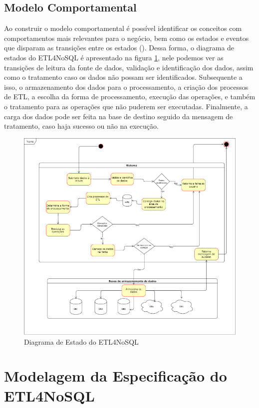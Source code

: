 \subsection{Modelo Comportamental}

Ao construir o modelo comportamental é possível identificar os conceitos com comportamentos mais relevantes para o negócio, bem como os estados e eventos que disparam as transições entre os estados (\cite{itana:2005}). Dessa forma, o diagrama de estados do ETL4NoSQL é apresentado na figura \ref{diagrama_estado}, nele podemos ver as transições de leitura da fonte de dados, validação e identificação dos dados, assim como o tratamento caso os dados não possam ser identificados. Subsequente a isso, o armazenamento dos dados para o processamento, a criação dos processos de ETL, a escolha da forma de processamento, execução das operações, e também o tratamento para as operações que não puderem ser executadas. Finalmente, a carga dos dados pode ser feita na base de destino seguido da mensagem de tratamento, caso haja sucesso ou não na execução.

\begin{figure}[h!]
	\centering
	\includegraphics[scale=0.6]{fig/diagrama_estado.png}
	\caption{Diagrama de Estado do ETL4NoSQL}
	\label{diagrama_estado}
\end{figure}

\section{Modelagem da Especificação do ETL4NoSQL}

